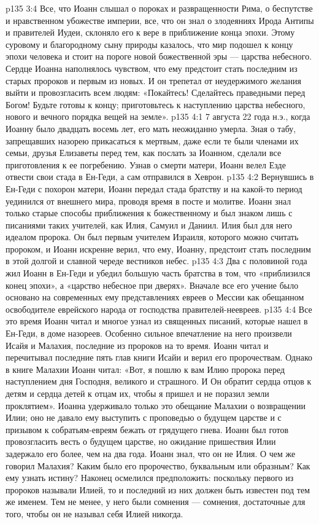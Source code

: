 \vs p135 3:4 Все, что Иоанн слышал о пороках и развращенности Рима, о беспутстве и нравственном убожестве империи, все, что он знал о злодеяниях Ирода Антипы и правителей Иудеи, склоняло его к вере в приближение конца эпохи. Этому суровому и благородному сыну природы казалось, что мир подошел к концу эпохи человека и стоит на пороге новой божественной эры --- царства небесного. Сердце Иоанна наполнялось чувством, что ему предстоит стать последним из старых пророков и первым из новых. И он трепетал от неудержимого желания выйти и провозгласить всем людям: «Покайтесь! Сделайтесь праведными перед Богом! Будьте готовы к концу; приготовьтесь к наступлению царства небесного, нового и вечного порядка вещей на земле».
\vs p135 4:1 7 августа 22 года н.э., когда Иоанну было двадцать восемь лет, его мать неожиданно умерла. Зная о табу, запрещавших назорею прикасаться к мертвым, даже если те были членами их семьи, друзья Елизаветы перед тем, как послать за Иоанном, сделали все приготовления к ее погребению. Узнав о смерти матери, Иоанн велел Езде отвести свои стада в Ен\hyp{}Геди, а сам отправился в Хеврон.
\vs p135 4:2 Вернувшись в Ен\hyp{}Геди с похорон матери, Иоанн передал стада братству и на какой\hyp{}то период уединился от внешнего мира, проводя время в посте и молитве. Иоанн знал только старые способы приближения к божественному и был знаком лишь с писаниями таких учителей, как Илия, Самуил и Даниил. Илия был для него идеалом пророка. Он был первым учителем Израиля, которого можно считать пророком, и Иоанн искренне верил, что ему, Иоанну, предстоит стать последним в этой долгой и славной череде вестников небес.
\vs p135 4:3 Два с половиной года жил Иоанн в Ен\hyp{}Геди и убедил большую часть братства в том, что «приблизился конец эпохи», а «царство небесное при дверях». Вначале все его учение было основано на современных ему представлениях евреев о Мессии как обещанном освободителе еврейского народа от господства правителей\hyp{}неевреев.
\vs p135 4:4 Все это время Иоанн читал и многое узнал из священных писаний, которые нашел в Ен\hyp{}Геди, в доме назореев. Особенно сильное впечатление на него произвели Исайя и Малахия, последние из пророков на то время. Иоанн читал и перечитывал последние пять глав книги Исайи и верил его пророчествам. Однако в книге Малахии Иоанн читал: «Вот, я пошлю к вам Илию пророка перед наступлением дня Господня, великого и страшного. И Он обратит сердца отцов к детям и сердца детей к отцам их, чтобы я пришел и не поразил земли проклятием». Иоанна удерживало только это обещание Малахии о возвращении Илии; оно не давало ему выступить с проповедью о будущем царстве и с призывом к собратьям\hyp{}евреям бежать от грядущего гнева. Иоанн был готов провозгласить весть о будущем царстве, но ожидание пришествия Илии задержало его более, чем на два года. Иоанн знал, что он не Илия. О чем же говорил Малахия? Каким было его пророчество, буквальным или образным? Как ему узнать истину? Наконец осмелился предположить: поскольку первого из пророков называли Илией, то и последний из них должен быть известен под тем же именем. Тем не менее, у него были сомнения --- сомнения, достаточные для того, чтобы он не называл себя Илией никогда.
